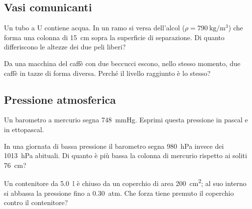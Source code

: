 \subsection*{Vasi comunicanti}

\begin{esercizio}
Un tubo a U contiene acqua. In un ramo si versa dell'alcol ($\rho = \SI{790}{\kilo\gram\per\metre\cubed}$) che forma una colonna di \SI{15}{\centi\metre} sopra la superficie di separazione. Di quanto differiscono le altezze dei due peli liberi?\\
\end{esercizio}

\begin{esercizio}
Da una macchina del caffè con due beccucci escono, nello stesso momento, due caffè in tazze di forma diversa. Perché il livello raggiunto è lo stesso?\\
\end{esercizio}

\subsection*{Pressione atmosferica}

\begin{esercizio}
Un barometro a mercurio segna \SI{748}{\mmHg}. Esprimi questa pressione in pascal e in ettopascal.\\
\end{esercizio}

\begin{esercizio}
In una giornata di bassa pressione il barometro segna \SI{980}{\hecto\pascal} invece dei \SI{1013}{\hecto\pascal} abituali. Di quanto è più bassa la colonna di mercurio rispetto ai soliti \SI{76}{\centi\metre}?\\
\end{esercizio}

\begin{esercizio}
Un contenitore da \SI{5,0}{\litre} è chiuso da un coperchio di area \SI{200}{\centi\metre\squared}; al suo interno si abbassa la pressione fino a \SI{0,30}{atm}. Che forza tiene premuto il coperchio contro il contenitore?\\
\end{esercizio}

